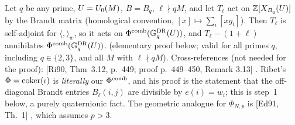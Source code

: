 \begin{proposition}\label{prop:s03-phieis}
Let $q$ be any prime, $U=U_0(M)$, $B=B_q$, $\ell\nmid qM$, and let $T_\ell$ act on $\mathbb{Z}[X_{B_q}(U)]$ by the Brandt matrix (homological
convention, $[x]\mapsto\sum_i[xg_i]$). Then $T_\ell$ is self-adjoint for $\langle,\rangle_w$, so it acts on $\Phi^{\mathrm{comb}}(\mathbb{G}^{\mathrm{DR}}_q(U))$, and
$T_\ell-(1+\ell)$ annihilates $\Phi^{\mathrm{comb}}(\mathbb{G}^{\mathrm{DR}}_q(U))$. \stproved{} (elementary proof below; valid for all primes $q$, including $q\in\{2,3\}$, and
all $M$ with $\ell\nmid qM$).
Cross-references (not needed for the proof): [Ri90, Thm~3.12, p.~449; proof p.~449--450, Remark 3.13]
. Ribet's $\Phi=\operatorname{coker}(\iota)$
is \emph{literally} our $\Phi^{\mathrm{comb}}$, and his proof is the statement that the off-diagonal Brandt entries $B_\ell(i,j)$ are divisible by
$e(i)=w_i$; this is step~1 below, a purely quaternionic fact. The geometric analogue for $\Phi_{N,p}$ is [Ed91, Th.~1] \stcited, which assumes $p>3$.
\end{proposition}
